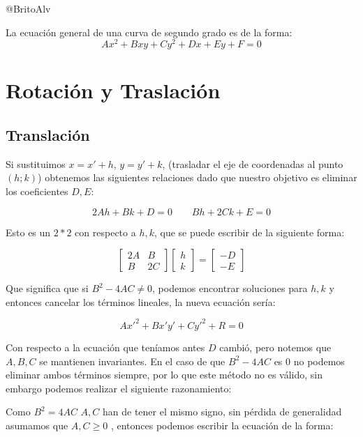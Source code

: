 \documentclass[14pt]{extarticle}
\begin{document}
@BritoAlv



\begin{tcolorbox}[colback=blue!5!white,colframe=blue!75!black, title = Curvas de Segundo Grado]

La ecuación general de una curva de segundo grado es de la forma: $$Ax^2+Bxy+Cy^2+Dx+Ey+F = 0$$
\end{tcolorbox}

\section{Rotación y Traslación}

\subsection{Translación}

Si sustituimos $x = x' + h$, $y = y'+k$, (trasladar el eje de coordenadas al punto $(h;k)$) obtenemos las siguientes relaciones dado que nuestro objetivo es eliminar los coeficientes $D,E$: 

$$
2Ah + Bk + D = 0  \, \, \, \, \, \, \, \, \, \, \, \, Bh + 2Ck + E = 0
$$

Esto es un $2*2$ con respecto a $h,k$, que se puede escribir de la siguiente forma: 

$$
\begin{bmatrix}
    2A & B \\ B & 2C
\end{bmatrix}
    \begin{bmatrix}
        h \\ k
    \end{bmatrix} = 
    \begin{bmatrix}
        -D \\ -E
    \end{bmatrix}
$$ 

Que significa que si $B^2 -4AC \neq 0$, podemos encontrar soluciones para $h,k$ y entonces cancelar los términos lineales, la nueva ecuación sería:

$$Ax'^2 + Bx'y' + Cy'^2 + R = 0$$

Con respecto a la ecuación que teníamos antes $D$ cambió, pero notemos que $A,B,C$ se mantienen invariantes. En el caso de que $B^2-4AC$ es $0$ no podemos eliminar ambos términos siempre, por lo que este método no es válido, sin embargo podemos realizar el siguiente razonamiento:

Como $B^2 = 4AC$ $A,C$ han de tener el mismo signo, sin pérdida de generalidad asumamos que $A,C \geq 0$ , entonces podemos escribir la ecuación de la forma:
\end{document}
